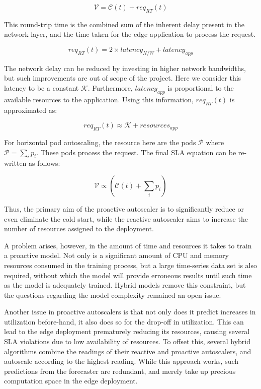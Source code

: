 \[ \mathcal{V} = \mathcal{C}(t) + req_{RT}(t)\]

This round-trip time is the combined sum of the inherent delay present in the network layer, and the time taken for the edge application to process the request.

\[ req_{RT}(t) = 2 \times latency_{N/W} + latency_{app} \]

The network delay can be reduced by investing in higher network bandwidths, but such improvements are out of scope of the project. Here we consider this latency to be a constant $\mathcal{K}$. Furthermore, $latency_{app}$ is proportional to the available resources to the application. Using this information, $req_{RT}(t)$ is approximated as:

\[ req_{RT}(t) \approx \mathcal{K} + resources_{app} \]

For horizontal pod autoscaling, the resource here are the pods $\mathcal{P}$ where $\mathcal{P} = \sum_{i} p_{i}$. These pods process the request. The final SLA equation can be re-written as follows:

\[ \mathcal{V} \propto ( \mathcal{C}(t) + \sum_{i} p_{i} )\]

Thus, the primary aim of the proactive autoscaler is to significantly reduce or even eliminate the cold start, while the reactive autoscaler aims to increase the number of resources assigned to the deployment.\par

A problem arises, however, in the amount of time and resources it takes to train a proactive model. Not only is a significant amount of CPU and memory resources consumed in the training process, but a large time-series data set is also required, without which the model will provide erroneous results until such time as the model is adequately trained. Hybrid models remove this constraint, but the questions regarding the model complexity remained an open issue.\par

Another issue in proactive autoscalers is that not only does it predict increases in utilization before-hand, it also does so for the drop-off in utilization. This can lead to the edge deployment prematurely reducing its resources, causing several SLA violations due to low availability of resources. To offset this, several hybrid algorithms combine the readings of their reactive and proactive autoscalers, and autoscale according to the highest reading. While this approach works, such predictions from the forecaster are redundant, and merely take up precious computation space in the edge deployment.\par

